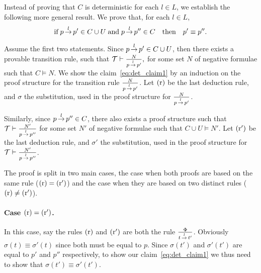 Instead of proving that $C$ is deterministic for each $l \in L$, we establish the following more general result.
We prove that, for each $l \in L$, 
\begin{equation}\label{eq:det_claim1}
    \textrm{if} \;  p \,{\stackrel{{l}}{\rightarrow}}\, p' \in C \cup U   \;
    \textrm{and} \; p \,{\stackrel{{l}}{\rightarrow}}\, p'' \in C      \quad
    \textrm{then} \quad p' \equiv p''.
\end{equation}

Assume the first two statements.
Since $p \,{\stackrel{{l}}{\rightarrow}}\, p' \in C \cup U$, then there exists a provable transition rule, such that
$\mathcal{T} \vdash \frac{N}{p \,{\stackrel{{l}}{\rightarrow}}\, p'},$
for some set $N$ of negative formulae such that $C \vDash N$.
We show the claim~\eqref{eq:det_claim1} by an induction on the proof structure
for the transition rule $\frac{N}{p \,{\stackrel{{l}}{\rightarrow}}\, p'}$.
Let $\mathrm{(r)}$ be the last deduction rule, and $\sigma$ the substitution,
used in the proof structure for $\frac{N}{p \,{\stackrel{{l}}{\rightarrow}}\, p'}$.


Similarly, since $p \,{\stackrel{{l}}{\rightarrow}}\, p'' \in C$,
there also exists a proof structure such that 
$\mathcal{T} \vdash \frac{N'}{p \,{\stackrel{{l}}{\rightarrow}}\, p''}$
for some set $N'$ of negative formulae such that $C \cup U \vDash N'$.
Let $\mathrm{(r')}$ be the last deduction rule, and $\sigma'$ the substitution,
used in the proof structure for $\mathcal{T} \vdash \frac{N'}{p \,{\stackrel{{l}}{\rightarrow}}\, p''}$.

The proof is split in two main cases, the case when both proofs are based on the
same rule ($\mathrm{(r)} = \mathrm{(r')}$) and the case when they are based on two distinct
rules ($\mathrm{(r)} \ne \mathrm{(r')}$).

\paragraph{Case $\mathrm{(r)} = \mathrm{(r')}$.}
In this case, say the rules $\mathrm{(r)}$ and $\mathrm{(r')}$ are both the rule $\frac{\Phi}{t\,{\stackrel{{l}}{\rightarrow}}\,t'}$.
Obviously $\sigma(t)\equiv\sigma'(t)$ since both must be equal to $p$.
Since $\sigma(t')$ and $\sigma'(t')$ are equal to $p'$ and $p''$ respectively, 
to show our claim~\eqref{eq:det_claim1} we thus need to show that $\sigma(t') \equiv \sigma'(t')$.


